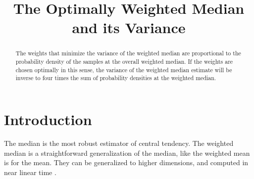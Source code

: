\documentclass[ejs]{imsart}
\numberwithin{equation}{section}
\theoremstyle{plain}
\begin{document}
\begin{frontmatter}
\title{The Optimally Weighted Median and its Variance}

\begin{aug}
\author{ }
\address{Iserbrooker Weg 65, Hamburg }

\end{aug}

\begin{abstract}
The weights that minimize the variance of the weighted median are proportional to the probability density of the samples at the overall weighted median.
If the weights are chosen optimally in this sense, the variance of the weighted median estimate will be inverse to four times the sum of probability densities at the weighted median.
\end{abstract}

\begin{keyword}[class=MSC]
\end{keyword}

\begin{keyword}
\end{keyword}
\tableofcontents
\end{frontmatter}

\section{Introduction}
The median is the most robust estimator of central tendency.
The weighted median is a straightforward generalization of the median, like the weighted mean is for the mean.
They can be generalized to higher dimensions, and computed in near linear time \cite{geometric_median_in_nearly_linear_time,centerpoint_in_linear_time}.
\end{document}
